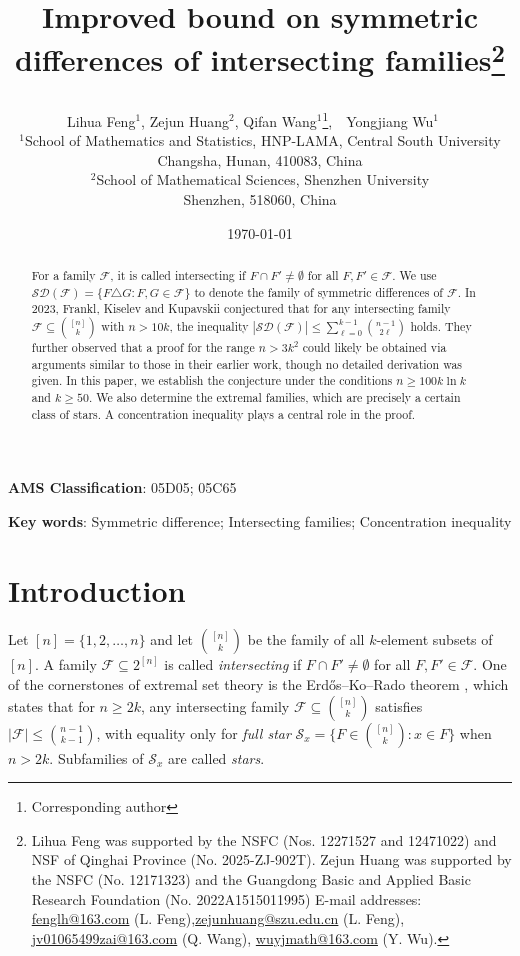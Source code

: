 \documentclass[11pt]{article}
\date{\today}
\title{\bf \Large Improved bound on  symmetric differences of intersecting families\footnote{ Lihua Feng was supported by the NSFC (Nos. 12271527 and 12471022) and NSF of Qinghai Province (No. 2025-ZJ-902T). Zejun Huang was supported by the NSFC
(No. 12171323) and the Guangdong Basic and Applied Basic Research Foundation (No.
2022A1515011995)
E-mail addresses: \url{fenglh@163.com} (L. Feng),\url{zejunhuang@szu.edu.cn} (L. Feng), \url{jv01065499zai@163.com} (Q. Wang), \url{wuyjmath@163.com} (Y. Wu). }
\author{
{\small Lihua Feng$^{1}$, Zejun Huang$^{2}$, Qifan Wang$^{1}$\footnote{Corresponding author},\ \ Yongjiang Wu$^{1}$\ \ 
}\\[2mm]
\small $^1$School of Mathematics and Statistics, HNP-LAMA, Central South University\\
 \small Changsha, Hunan, 410083, China\\ 
 \small $^2$School of Mathematical Sciences, Shenzhen University\\ \small Shenzhen, 518060, China\\
}}
\numberwithin{equation}{section}
\begin{document}
	\maketitle
	\begin{abstract}
For a family  $\mathcal{F}$, it is called intersecting if $F\cap F'\neq \emptyset$ for all $F,F'\in\mathcal{F}$.
 We use $\mathcal{SD}(\mathcal{F}) = \{F \triangle G : F, G \in \mathcal{F}\}$ to denote
  the family of symmetric differences of $\mathcal{F}$. 
 In 2023, Frankl, Kiselev and Kupavskii conjectured that for any intersecting family $\mathcal{F} \subseteq \binom{[n]}{k}$ with $n > 10k$, the  inequality $|\mathcal{SD}(\mathcal{F})| \le \sum_{\ell=0}^{k-1} \binom{n-1}{2\ell}$ holds. They further observed that a proof for the range $n>3k^2$ could likely be obtained via arguments similar to those in their earlier work, though no detailed derivation was given.  In this paper, we establish the conjecture under the conditions  $n\ge 100k\ln k$ and  $k\ge 50$.
 We also  determine the extremal families, which are precisely a certain class of  stars.  A concentration inequality plays a central role in the proof.
\end{abstract}
	
	
	
	
{\bf AMS Classification}:  05D05; 05C65
	
{\bf Key words}: Symmetric difference; Intersecting families; Concentration inequality



\section{Introduction}

Let $[n]=\{1,2,\dots,n\}$ and let $\binom{[n]}{k}$  be the family of all $k$-element subsets of $[n]$. 
A family $\mathcal{F}\subseteq 2^{[n]}$ is called \textit{intersecting} if $F\cap F'\neq\emptyset$ for all $F,F'\in\mathcal{F}$. 
One of the cornerstones of extremal set theory is the Erd\H{o}s--Ko--Rado theorem \cite{E61}, which states that for $n\ge 2k$, any intersecting family $\mathcal{F}\subseteq\binom{[n]}{k}$ satisfies 
$|\mathcal{F}|\le\binom{n-1}{k-1}$, with equality only for \textit{ full star} 
$\mathcal{S}_x=\{F\in\binom{[n]}{k}:x\in F\}$ when $n>2k$. Subfamilies of $\mathcal{S}_x$ are called \textit{stars}.
\end{document}
